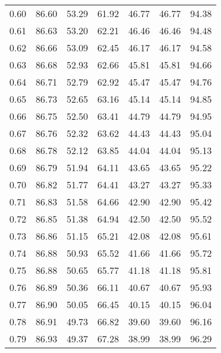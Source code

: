 \begin{tabular}{|c|c|c|c|c|c|c|}
      0.60 &     86.60 &     53.29 &      61.92 &   46.77 &      46.77 &         94.38 \\
      0.61 &     86.63 &     53.20 &      62.21 &   46.46 &      46.46 &         94.48 \\
      0.62 &     86.66 &     53.09 &      62.45 &   46.17 &      46.17 &         94.58 \\
      0.63 &     86.68 &     52.93 &      62.66 &   45.81 &      45.81 &         94.66 \\
      0.64 &     86.71 &     52.79 &      62.92 &   45.47 &      45.47 &         94.76 \\
      0.65 &     86.73 &     52.65 &      63.16 &   45.14 &      45.14 &         94.85 \\
      0.66 &     86.75 &     52.50 &      63.41 &   44.79 &      44.79 &         94.95 \\
      0.67 &     86.76 &     52.32 &      63.62 &   44.43 &      44.43 &         95.04 \\
      0.68 &     86.78 &     52.12 &      63.85 &   44.04 &      44.04 &         95.13 \\
      0.69 &     86.79 &     51.94 &      64.11 &   43.65 &      43.65 &         95.22 \\
      0.70 &     86.82 &     51.77 &      64.41 &   43.27 &      43.27 &         95.33 \\
      0.71 &     86.83 &     51.58 &      64.66 &   42.90 &      42.90 &         95.42 \\
      0.72 &     86.85 &     51.38 &      64.94 &   42.50 &      42.50 &         95.52 \\
      0.73 &     86.86 &     51.15 &      65.21 &   42.08 &      42.08 &         95.61 \\
      0.74 &     86.88 &     50.93 &      65.52 &   41.66 &      41.66 &         95.72 \\
      0.75 &     86.88 &     50.65 &      65.77 &   41.18 &      41.18 &         95.81 \\
      0.76 &     86.89 &     50.36 &      66.11 &   40.67 &      40.67 &         95.93 \\
      0.77 &     86.90 &     50.05 &      66.45 &   40.15 &      40.15 &         96.04 \\
      0.78 &     86.91 &     49.73 &      66.82 &   39.60 &      39.60 &         96.16 \\
      0.79 &     86.93 &     49.37 &      67.28 &   38.99 &      38.99 &         96.29 \\

\end{tabular}
